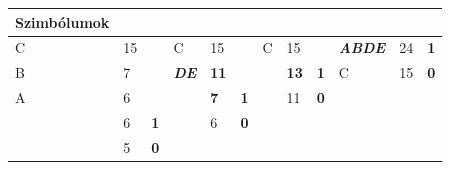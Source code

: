 \documentclass[12pt,margin=0px]{article}
\begin{document}
    \renewcommand{\arraystretch}{1.8}
    {\footnotesize
        \noindent \begin{tabular}{|llllllllllll|}
            \hline
            {\color[HTML]{333333} Szimbólumok}    &    &            &                 &        &            &               &        &            &           &          &           \\ \hline
            C             & 15 & \multicolumn{1}{l|}{}          & {\color[HTML]{333333} C}            & {\color[HTML]{333333} 15}      & \multicolumn{1}{l|}{}          & C             & 15         & \multicolumn{1}{l|}{}          & {\color[HTML]{00009B} \textit{\textbf{ABDE}}} & {\color[HTML]{333333} 24}    & {\color[HTML]{9A0000} \textbf{1}} \\ \cline{7-7}
            B             & 7  & \multicolumn{1}{l|}{}          & {\color[HTML]{010066} \textit{\textbf{DE}}}         & {\color[HTML]{333333} \textbf{11}} & \multicolumn{1}{l|}{}          & \multicolumn{1}{l|}{\cellcolor[HTML]{FFFFC7}{\color[HTML]{303498} {\ul \textbf{AB}}}} & {\color[HTML]{303498} \textbf{13}} & \multicolumn{1}{l|}{{\color[HTML]{9A0000} \textbf{1}}} & {\color[HTML]{333333} C}      & {\color[HTML]{333333} 15}    & {\color[HTML]{9A0000} \textbf{0}} \\ \cline{4-4}
            A             & 6  & \multicolumn{1}{l|}{}          & \multicolumn{1}{l|}{\cellcolor[HTML]{FFFFC7}{\color[HTML]{333333} {\ul B}}} & {\color[HTML]{333333} \textbf{7}}  & \multicolumn{1}{l|}{{\color[HTML]{9A0000} \textbf{1}}} & \multicolumn{1}{l|}{\cellcolor[HTML]{FFFFC7}{\color[HTML]{333333} {\ul DE}}}      & {\color[HTML]{333333} 11}      & \multicolumn{1}{l|}{{\color[HTML]{9A0000} \textbf{0}}} & {\color[HTML]{00009B} \textit{\textbf{}}}     & {\color[HTML]{CB0000} \textbf{}} &           \\ \cline{1-1} \cline{7-7}
            \multicolumn{1}{|l|}{\cellcolor[HTML]{FFFFC7}{\ul D}} & 6  & \multicolumn{1}{l|}{{\color[HTML]{9A0000} \textbf{1}}} & \multicolumn{1}{l|}{\cellcolor[HTML]{FFFFC7}{\ul A}}    & 6          & \multicolumn{1}{l|}{{\color[HTML]{9A0000} \textbf{0}}} &               &        & \multicolumn{1}{l|}{}          & {\color[HTML]{00009B} \textit{\textbf{}}}     & {\color[HTML]{CB0000} \textbf{}} &           \\ \cline{4-4}
            \multicolumn{1}{|l|}{\cellcolor[HTML]{FFFFC7}{\ul E}} & 5  & \multicolumn{1}{l|}{{\color[HTML]{9A0000} \textbf{0}}} &                 &        & \multicolumn{1}{l|}{}          &               &        & \multicolumn{1}{l|}{}          &           &          &           \\ \hline
        \end{tabular}\\\\
    }
    \renewcommand{\arraystretch}{1}
\end{document}
